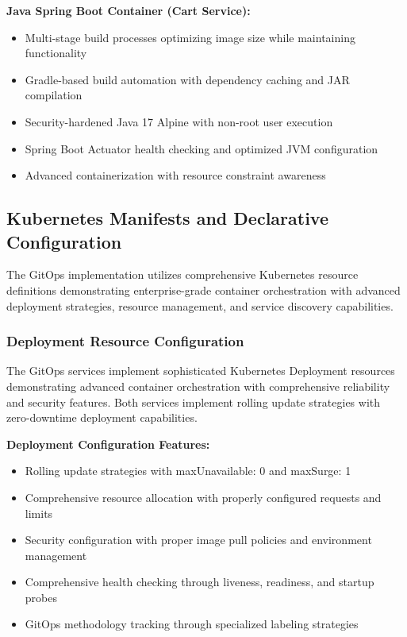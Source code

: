 \textbf{Java Spring Boot Container (Cart Service):}
\begin{itemize}
\item Multi-stage build processes optimizing image size while maintaining functionality
\item Gradle-based build automation with dependency caching and JAR compilation
\item Security-hardened Java 17 Alpine with non-root user execution
\item Spring Boot Actuator health checking and optimized JVM configuration
\item Advanced containerization with resource constraint awareness
\end{itemize}

\subsection{Kubernetes Manifests and Declarative Configuration}

The GitOps implementation utilizes comprehensive Kubernetes resource definitions demonstrating enterprise-grade container orchestration with advanced deployment strategies, resource management, and service discovery capabilities.

\subsubsection{Deployment Resource Configuration}

The GitOps services implement sophisticated Kubernetes Deployment resources demonstrating advanced container orchestration with comprehensive reliability and security features. Both services implement rolling update strategies with zero-downtime deployment capabilities.

\textbf{Deployment Configuration Features:}
\begin{itemize}
\item Rolling update strategies with maxUnavailable: 0 and maxSurge: 1
\item Comprehensive resource allocation with properly configured requests and limits
\item Security configuration with proper image pull policies and environment management
\item Comprehensive health checking through liveness, readiness, and startup probes
\item GitOps methodology tracking through specialized labeling strategies
\end{itemize}

